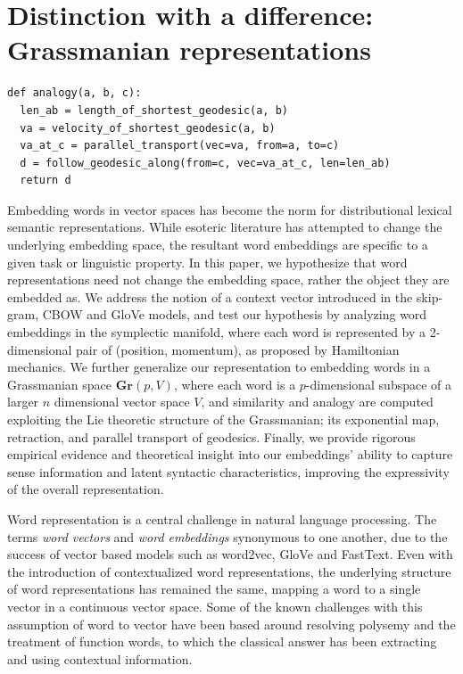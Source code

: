 \documentclass{book}
\begin{document}
\chapter{Distinction with a difference: Grassmanian representations}
\begin{verbatim}
def analogy(a, b, c):
  len_ab = length_of_shortest_geodesic(a, b)
  va = velocity_of_shortest_geodesic(a, b)
  va_at_c = parallel_transport(vec=va, from=a, to=c)
  d = follow_geodesic_along(from=c, vec=va_at_c, len=len_ab)
  return d
\end{verbatim}

Embedding words in vector spaces has become the norm for distributional
lexical semantic representations. While esoteric literature has attempted
to change the underlying embedding space, the resultant word embeddings are
specific to a given task or linguistic property. In this paper, we
hypothesize that word representations need not change the embedding space,
rather the object they are embedded as. We address the notion of a context
vector introduced in the skip-gram, CBOW and GloVe models, and test our
hypothesis by analyzing word embeddings in the symplectic manifold, where
each word is represented by a 2-dimensional pair of (position, momentum),
as proposed by Hamiltonian mechanics. We further generalize our
representation to embedding words in a Grassmanian space $\mathbf{Gr}(p, V)$,
where each word is a $p$-dimensional subspace of a larger $n$
dimensional vector space $V$, and similarity and analogy are computed
exploiting the Lie theoretic structure of the Grassmanian; its exponential
map, retraction, and parallel transport of geodesics. Finally, we provide
rigorous empirical evidence and theoretical insight into our embeddings'
ability to capture sense information and latent syntactic characteristics,
improving the expressivity of the overall representation.

Word representation is a central challenge in natural language processing. The
terms \emph{word vectors} and \emph{word embeddings} synonymous to one another,
due to the success of vector based models such as word2vec, GloVe and FastText.
Even with the introduction of contextualized word representations, the
underlying structure of word representations has remained the same, mapping a
word to a single vector in a continuous vector space. Some of the known
challenges with this assumption of word to vector have been based around
resolving polysemy and the treatment of function words, to which the classical
answer has been extracting and using contextual information. 
\end{document}
